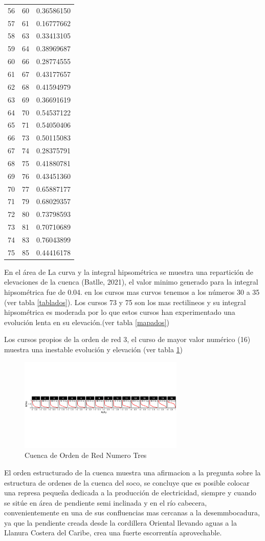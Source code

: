 \documentclass[11pt,]{article}
\begin{document}
\begin{longtable}[]{@{}lll@{}}
56 & 60 & 0.36586150\tabularnewline
57 & 61 & 0.16777662\tabularnewline
58 & 63 & 0.33413105\tabularnewline
59 & 64 & 0.38969687\tabularnewline
60 & 66 & 0.28774555\tabularnewline
61 & 67 & 0.43177657\tabularnewline
62 & 68 & 0.41594979\tabularnewline
63 & 69 & 0.36691619\tabularnewline
64 & 70 & 0.54537122\tabularnewline
65 & 71 & 0.54050406\tabularnewline
66 & 73 & 0.50115083\tabularnewline
67 & 74 & 0.28375791\tabularnewline
68 & 75 & 0.41880781\tabularnewline
69 & 76 & 0.43451360\tabularnewline
70 & 77 & 0.65887177\tabularnewline
71 & 79 & 0.68029357\tabularnewline
72 & 80 & 0.73798593\tabularnewline
73 & 81 & 0.70710689\tabularnewline
74 & 83 & 0.76043899\tabularnewline
75 & 85 & 0.44416178\tabularnewline
\bottomrule
\end{longtable}

En el área de La curva y la integral hipsométrica se muestra una
repartición de elevaciones de la cuenca (Batlle, 2021), el valor minimo
generado para la integral hipsométrica fue de 0.04. en los cursos mas
curvos tenemos a los números 30 a 35 (ver tabla \ref{tablados}). Los
cursos 73 y 75 son los mas rectilineos y su integral hipsométrica es
moderada por lo que estos cursos han experimentado una evolución lenta
en su elevación.(ver tabla \ref{mapados})

Los cursos propios de la orden de red 3, el curso de mayor valor
numérico (16) muestra una inestable evolución y elevación (ver tabla
\ref{mapacuatro})

\begin{figure}
\centering
\includegraphics[width=0.70000\textwidth]{cu de red or tres.png}
\caption{Cuenca de Orden de Red Numero Tres\label{mapacuatro}}
\end{figure}

El orden estructurado de la cuenca muestra una afirmacion a la pregunta
sobre la estructura de ordenes de la cuenca del soco, se concluye que es
posible colocar una represa pequeña dedicada a la producción de
electricidad, siempre y cuando se sitúe en área de pendiente semi
inclinada y en el río cabecera, convenientemente en una de sus
confluencias mas cercanas a la desemmbocadura, ya que la pendiente
creada desde la cordillera Oriental llevando aguas a la Llanura Costera
del Caribe, crea una fuerte escorrentía aprovechable.
\end{document}
